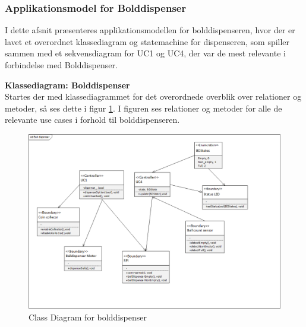 \documentclass[Arkitektur/System_main.tex]{subfiles}
\begin{document}
\subsubsection{Applikationsmodel for Bolddispenser}
I dette afsnit præsenteres applikationsmodellen for bolddispenseren, hvor der er lavet et overordnet klassediagram og statemachine for dispenseren, som spiller sammen med et sekvensdiagram for UC1 og UC4, der var de mest relevante i forbindelse med Bolddispenser.

\textbf{Klassediagram: Bolddispenser}\\
Startes der med klassediagrammet for det overordnede overblik over relationer og metoder, så ses dette i figur \ref{fig:cd_balldispenser}. I figuren ses relationer og metoder for alle de relevante use cases i forhold til bolddispenseren.
\begin{figure}[H]
    \centering
    \includegraphics[width=\textwidth]{Arkitektur/Softwarearkitektur/Applikationsmodel/BallDispenser/graphicsBallDispenser/ApplikationsmodelBolddispensercd.png}
    \caption{Class Diagram for bolddispenser}
    \label{fig:cd_balldispenser}
\end{figure}
\newpage
\end{document}
